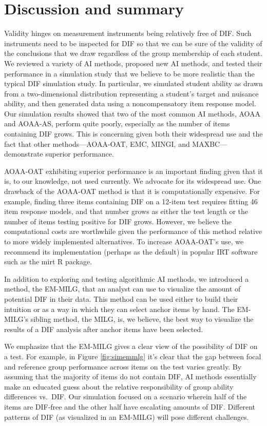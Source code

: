 \documentclass[
  11pt,
]{article}
\begin{document}
\hypertarget{discussion-and-summary}{%
\section{Discussion and summary}\label{discussion-and-summary}}

Validity hinges on measurement instruments being relatively free of DIF. Such instruments need to be inspected for DIF so that we can be sure of the validity of the conclusions that we draw regardless of the group membership of each student. We reviewed a variety of AI methods, proposed new AI methods, and tested their performance in a simulation study that we believe to be more realistic than the typical DIF simulation study. In particular, we simulated student ability as drawn from a two-dimensional distribution representing a student's target and nuisance ability, and then generated data using a noncompensatory item response model. Our simulation results showed that two of the most common AI methods, AOAA and AOAA-AS, perform quite poorly, especially as the number of items containing DIF grows. This is concerning given both their widespread use and the fact that other methods---AOAA-OAT, EMC, MINGI, and MAXBC---demonstrate superior performance.

AOAA-OAT exhibiting superior performance is an important finding given that it is, to our knowledge, not used currently. We advocate for its widespread use. One drawback of the AOAA-OAT method is that it is computationally expensive. For example, finding three items containing DIF on a 12-item test requires fitting 46 item response models, and that number grows as either the test length or the number of items testing positive for DIF grows. However, we believe the computational costs are worthwhile given the performance of this method relative to more widely implemented alternatives. To increase AOAA-OAT's use, we recommend its implementation (perhaps as the default) in popular IRT software such as the mirt R package.

In addition to exploring and testing algorithmic AI methods, we introduced a method, the EM-MILG, that an analyst can use to visualize the amount of potential DIF in their data. This method can be used either to build their intuition or as a way in which they can select anchor items by hand. The EM-MILG's sibling method, the MILG, is, we believe, the best way to visualize the results of a DIF analysis after anchor items have been selected.

We emphasize that the EM-MILG gives a clear view of the possibility of DIF on a test. For example, in Figure \ref{fig:simemmlg} it's clear that the gap between focal and reference group performance across items on the test varies greatly. By assuming that the majority of items do not contain DIF, AI methods essentially make an educated guess about the relative responsibility of group ability differences vs.~DIF. Our simulation focused on a scenario wherein half of the items are DIF-free and the other half have escalating amounts of DIF. Different patterns of DIF (as visualized in an EM-MILG) will pose different challenges.
\end{document}
